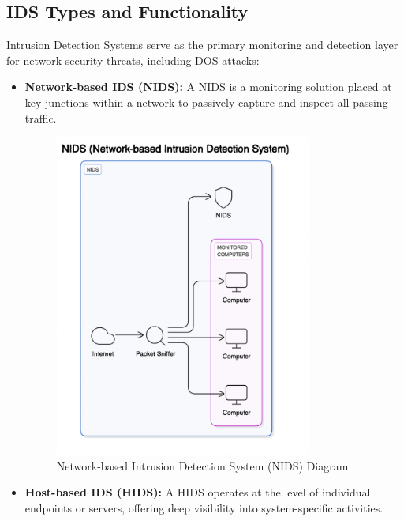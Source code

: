 \documentclass{report}
\begin{document}
\subsection{IDS Types and Functionality}
Intrusion Detection Systems serve as the primary monitoring and detection layer for network security threats, including DOS attacks:
\begin{itemize}
    \item \textbf{Network-based IDS (NIDS):} A NIDS is a monitoring solution placed at key junctions within a network to passively capture and inspect all passing traffic.
        \begin{figure}[ht]
            \centering
            \includegraphics[width=0.8\textwidth]{images/nids-diagram.png}
            \caption{Network-based Intrusion Detection System (NIDS) Diagram}
            \label{fig:nids-diagram}
        \end{figure}
    \item \textbf{Host-based IDS (HIDS):} A HIDS operates at the level of individual endpoints or servers, offering deep visibility into system-specific activities.
        \begin{figure}[ht]
            \centering

\end{figure}
\end{itemize}
\end{document}
